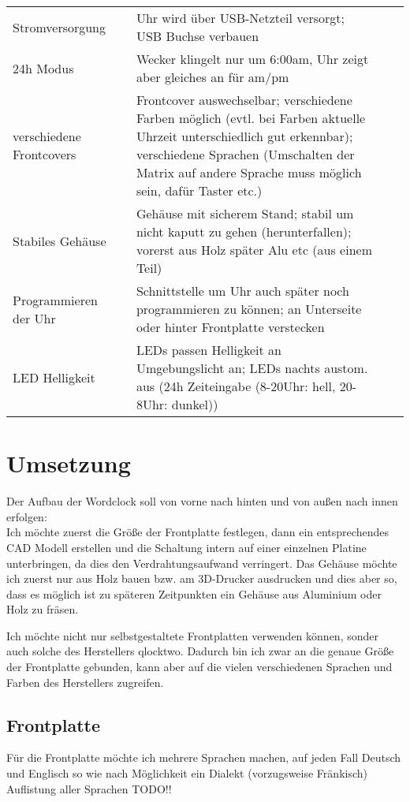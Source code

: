 \documentclass[11pt,a4paper,ngerman]{article}
\begin{document}
\begin{landscape}
\begin{tabular}[]{p{2cm}p{2cm}p{10cm}p{2cm}p{2cm}}
	Stromversorgung && Uhr wird über USB-Netzteil versorgt; USB Buchse verbauen \\
	24h Modus && Wecker klingelt nur um 6:00am, Uhr zeigt aber gleiches an für am/pm\\
	verschiedene Frontcovers & & Frontcover auswechselbar; verschiedene Farben möglich (evtl. bei Farben aktuelle Uhrzeit unterschiedlich gut erkennbar); verschiedene Sprachen (Umschalten der Matrix auf andere Sprache muss möglich sein, dafür Taster etc.)\\
	Stabiles Gehäuse & & Gehäuse mit sicherem Stand; stabil um nicht kaputt zu gehen (herunterfallen); vorerst aus Holz später Alu etc (aus einem Teil)\\
	Programmieren der Uhr && Schnittstelle um Uhr auch später noch programmieren zu können; an Unterseite oder hinter Frontplatte verstecken\\
	LED Helligkeit && LEDs passen Helligkeit an Umgebungslicht an; LEDs nachts austom. aus (24h Zeiteingabe (8-20Uhr: hell, 20-8Uhr: dunkel))

\end{tabular}
\end{landscape}

\section{Umsetzung}
	Der Aufbau der Wordclock soll von vorne nach hinten und von außen nach innen erfolgen:\\
	Ich möchte zuerst die Größe der Frontplatte festlegen, dann ein entsprechendes CAD Modell erstellen und die Schaltung intern auf einer einzelnen Platine unterbringen, da dies den Verdrahtungsaufwand verringert. Das Gehäuse möchte ich zuerst nur aus Holz bauen bzw. am 3D-Drucker ausdrucken und dies aber so, dass es möglich ist zu späteren Zeitpunkten ein Gehäuse aus Aluminium oder Holz zu fräsen. \par
	Ich möchte nicht nur selbstgestaltete Frontplatten verwenden können, sonder auch solche des Herstellers qlocktwo. Dadurch bin ich zwar an die genaue Größe der Frontplatte gebunden, kann aber auf die vielen verschiedenen Sprachen und Farben des Herstellers zugreifen. \par

\subsection{Frontplatte}
Für die Frontplatte möchte ich mehrere Sprachen machen, auf jeden Fall Deutsch und Englisch so wie nach Möglichkeit ein Dialekt (vorzugsweise Fränkisch)\\
Auflistung aller Sprachen TODO!!
\end{document}

